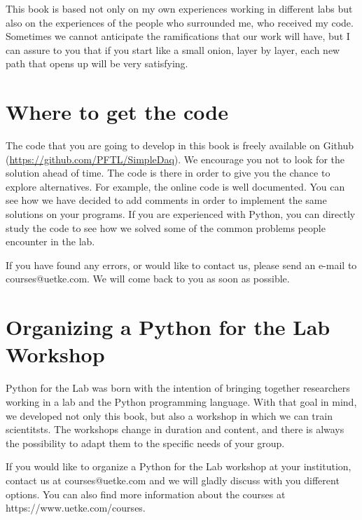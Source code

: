 This book is based not only on my own experiences working in different labs but also on the experiences of the people who surrounded me, who received my code. Sometimes we cannot anticipate the ramifications that our work will have, but I can assure to you that if you start like a small onion, layer by layer, each new path that opens up will be very satisfying. 

\section{Where to get the code}
The code that you are going to develop in this book is freely available on Github (\url{https://github.com/PFTL/SimpleDaq}). We encourage you not to look for the solution ahead of time. The code is there in order to give you the chance to explore alternatives. For example, the online code is well documented. You can see how we have decided to add comments in order to implement the same solutions on your programs. If you are experienced with Python, you can directly study the code to see how we solved some of the common problems people encounter in the lab. 

If you have found any errors, or would like to contact us, please send an e-mail to courses@uetke.com. We will come back to you as soon as possible. 

\section{Organizing a Python for the Lab Workshop}
Python for the Lab was born with the intention of bringing together researchers working in a lab and the Python programming language. With that goal in mind, we developed not only this book, but also a workshop in which we can train scientitsts. The workshops change in duration and content, and there is always the possibility to adapt them to the specific needs of your group. 

If you would like to organize a Python for the Lab workshop at your institution, contact us at courses@uetke.com and we will gladly discuss with you different options. You can also find more information about the courses at https://www.uetke.com/courses.
